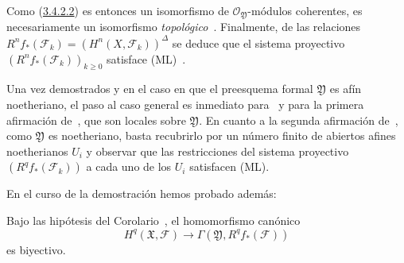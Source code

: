 \begin{env}[3.4.5]
Como (\hyperref[III.3.4.2.2]{3.4.2.2}) es entonces un isomorfismo de $\mathcal O_{\mathfrak Y}$-módulos coherentes, es necesariamente un isomorfismo \emph{topológico}~.
Finalmente, de las relaciones $R^nf_*(\mathcal F_k)=(H^n(X,\mathcal F_k))^\Delta$ se deduce que el sistema proyectivo $(R^nf_*(\mathcal F_k))_{k\geq0}$ satisface (ML)~.

Una vez demostrados  y  en el caso en que el preesquema formal $\mathfrak Y$ es afín noetheriano, el paso al caso general es inmediato para~ y para la primera afirmación de~, que son locales sobre $\mathfrak Y$.
En cuanto a la segunda afirmación de~, como $\mathfrak Y$ es noetheriano, basta recubrirlo por un número finito de abiertos afines noetherianos $U_i$ y observar que las restricciones del sistema proyectivo $(R^qf_*(\mathcal F_k))$ a cada uno de los $U_i$ satisfacen (ML).
\end{env}

En el curso de la demostración hemos probado además:
\begin{corollary}[3.4.6]
\label{III.3.4.6}
\label{III.3.4.6-fr}
Bajo las hipótesis del Corolario~, el homomorfismo canónico
\[
H^q(\mathfrak X,\mathcal F)
\longrightarrow\Gamma(\mathfrak Y,R^qf_*(\mathcal F))
\tag{3.4.6.1}\label{III.3.4.6.1-fr}
\]
es biyectivo.
\end{corollary}
